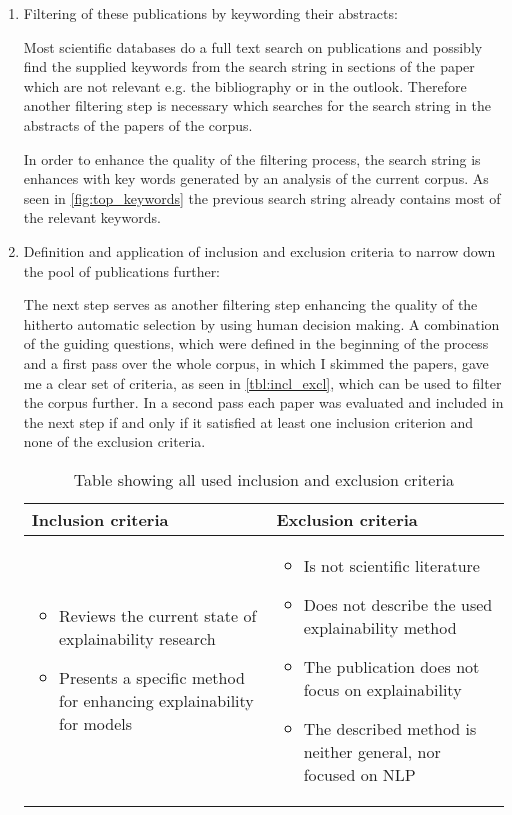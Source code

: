 \begin{enumerate}
	\item Filtering of these publications by keywording their abstracts:
	
	Most scientific databases do a full text search on publications and possibly find the supplied keywords from the search string in sections of the paper which are not relevant e.g. the bibliography or in the outlook. Therefore another filtering step is necessary which searches for the search string in the abstracts of the papers of the corpus.
	
	In order to enhance the quality of the filtering process, the search string is enhances with key words generated by an analysis of the current corpus. As seen in \autoref{fig:top_keywords} the previous search string already contains most of the relevant keywords.
	
	\item Definition and application of inclusion and exclusion criteria to narrow down the pool of publications further:
	
	The next step serves as another filtering step enhancing the quality of the hitherto automatic selection by using human decision making. A combination of the guiding questions, which were defined in the beginning of the process and a first pass over the whole corpus, in which I skimmed the papers, gave me a clear set of criteria, as seen in \autoref{tbl:incl_excl}, which can be used to filter the corpus further. In a second pass each paper was evaluated and included in the next step if and only if it satisfied at least one inclusion criterion and none of the exclusion criteria.	
	
	\begin{table}
		\centering
		\begin{tabular}{  p{5cm} | p{5cm} }
			Inclusion criteria & Exclusion criteria  \\ \hline
			
			\begin{itemize}
				\item Reviews the current state of explainability research
				\item Presents a specific method for enhancing explainability for models
			\end{itemize}
			
			&
			
			\begin{itemize}
				\item Is not scientific literature
				\item Does not describe the used explainability method
				\item The publication does not focus on explainability
				\item The described method is neither general, nor focused on NLP
			\end{itemize}
		\end{tabular}
		\caption{\label{tbl:incl_excl} Table showing all used inclusion and exclusion criteria}
	\end{table}
	

\end{enumerate}
